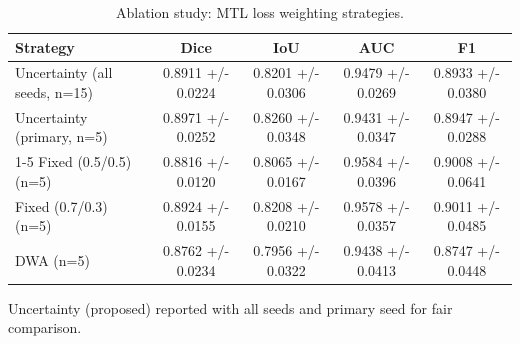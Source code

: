 \begin{table}[htbp]
  \centering
  \caption{Ablation study: MTL loss weighting strategies.}
  \label{tab:ablation_loss}
  \begin{tabular}{lcccc}
    \toprule
    Strategy & Dice & IoU & AUC & F1 \\
    \midrule
    Uncertainty (all seeds, n=15) & 0.8911 +/- 0.0224 & 0.8201 +/- 0.0306 & 0.9479 +/- 0.0269 & 0.8933 +/- 0.0380 \\
    Uncertainty (primary, n=5) & 0.8971 +/- 0.0252 & 0.8260 +/- 0.0348 & 0.9431 +/- 0.0347 & 0.8947 +/- 0.0288 \\
    \cmidrule(lr){1-5}
    Fixed (0.5/0.5) (n=5) & 0.8816 +/- 0.0120 & 0.8065 +/- 0.0167 & 0.9584 +/- 0.0396 & 0.9008 +/- 0.0641 \\
    Fixed (0.7/0.3) (n=5) & 0.8924 +/- 0.0155 & 0.8208 +/- 0.0210 & 0.9578 +/- 0.0357 & 0.9011 +/- 0.0485 \\
    DWA (n=5) & 0.8762 +/- 0.0234 & 0.7956 +/- 0.0322 & 0.9438 +/- 0.0413 & 0.8747 +/- 0.0448 \\
    \bottomrule
  \end{tabular}
  \vspace{2pt}
  \footnotesize{Uncertainty (proposed) reported with all seeds and primary seed for fair comparison.}
\end{table}